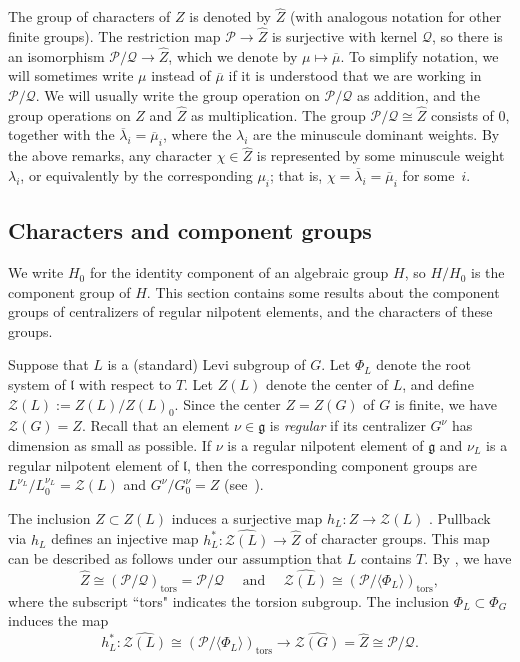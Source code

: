 \documentclass[reqno,11pt]{amsart}
\theoremstyle{remark}
\theoremstyle{remark}
\theoremstyle{definition}
\theoremstyle{definition}
\theoremstyle{definition}
\numberwithin{equation}{section}
\newcommand{\tors}{\operatorname{tors}}
\newcommand{\fg}{{\mathfrak g}}
\newcommand{\fl}{{\mathfrak l}}
\newcommand{\gl}{\lambda}
\newcommand{\cp}{\mathcal{P}}
\newcommand{\cq}{\mathcal{Q}}
\newcommand{\cz}{\mathcal{Z}}
\newcommand{\nilp}{\nu}
\renewcommand{\hat}{\widehat}
\begin{document}
The group of characters of $Z$ is denoted by $\hat{Z}$ (with analogous notation for other finite groups). The restriction map $\cp \to \hat{Z}$ is surjective with kernel $\cq$, so there is an isomorphism $\cp/\cq \to \hat{Z}$,
which we denote by $\mu \mapsto \overline{\mu}$.  To simplify notation, we will sometimes write $\mu$ instead of $\overline{\mu}$ if it is understood that
we are working in $\cp/\cq$.  We will usually
write the group operation on $\cp/\cq$ as addition, and the group operations on $Z$ and $\hat{Z}$ as multiplication.
The group $\cp/\cq \cong \hat{Z}$  consists of $0$, together with the $\overline{\lambda}_i = \overline{\mu}_i$, where the $\lambda_i$ are the minuscule dominant weights.     By the above remarks, any character $\chi \in \hat{Z}$ is represented by some minuscule weight $\gl_i$, or equivalently by the corresponding $\mu_i$; that is, $\chi = \overline{\lambda}_i = \overline{\mu}_i$ for some~$i$.


\subsection{Characters and component groups}  We write $H_0$ for the identity component of an algebraic group $H$, so $H/H_0$ is the component group of $H$. This section contains some results about the component groups of centralizers of regular nilpotent elements, and the characters of these groups.  

Suppose that $L$ is a (standard) Levi subgroup of $G$.  Let $\Phi_L$ denote the root system of $\fl$ with respect to $T$.   Let $Z(L)$ denote the center of $L$, and define $\cz(L) := Z(L)/Z(L)_0$. Since the center $Z = Z(G)$ of $G$ is finite,
we have $\cz(G) = Z$.   Recall that an element $\nilp \in \fg$ is \emph{regular} if its centralizer $G^{\nilp}$ has dimension as small as possible.  If $\nilp$ is a regular nilpotent element of $\fg$ and $\nilp_L$ is a regular nilpotent 
element of $\fl$, then the corresponding component groups are $L^{\nilp_L} / L^{\nilp_L}_0 =\cz(L)$ and $G^{\nilp}/G^{\nilp}_0 = Z$ (see~\cite[Prop.~3.1]{Bonnafe2004}).

The inclusion $Z \subset Z(L)$ induces a surjective map $h_L: Z \to \cz(L)$ \cite{Bonnafe2004}.  Pullback via $h_L$ defines an injective map
$h_L^*: \widehat{\cz(L)} \to \hat{Z}$ of character groups.  This map can be described as follows under our assumption that $L$ contains $T$.
By  \cite[Prop.~2.1]{Bonnafe2004}, we have
\[ 
\hat{Z} \cong (\cp/\cq )_{\tors} = \cp/\cq \quad \text{ and } \quad \widehat{\cz(L)} \cong (\cp /\langle \Phi_L \rangle)_{\tors},
\]
where the subscript ``tors" indicates the torsion subgroup.
The inclusion $\Phi_L \subset \Phi_G$
induces the map
$$
h_L^*: \widehat{\cz(L)} \cong (\cp /\langle \Phi_L \rangle)_{\tors} \to \widehat{\cz(G)} = \hat{Z} \cong \cp/\cq .
$$
\end{document}

